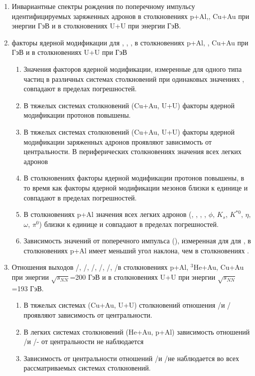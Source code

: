 {}
\begin{enumerate}[beginpenalty=10000] %
	\item 	Инвариантные спектры рождения по поперечному импульсу идентифицируемых заряженных адронов в столкновениях  p+Al,\heau, Cu+Au при энергии  ГэВ и в столкновениях U+U при энергии  ГэВ. \autocite{Gosele1999161,Lermontov}
	\item 	факторы ядерной модификации для \pipm, \Kpm, \prot, \aprot в столкновениях  p+Al, \heau, Cu+Au при  ГэВ и в столкновениях U+U при  ГэВ
		\begin{enumerate} 
			\item 	Значения факторов ядерной модификации, измеренные для одного типа частиц в различных системах столкновений при одинаковых значениях \Npart, совпадают в пределах погрешностей.
			\item В тяжелых системах столкновений  (Cu+Au, U+U) факторы ядерной модификации протонов повышены.
			\item В тяжелых системах столкновений  (Cu+Au, U+U) факторы ядерной модификации заряженных адронов проявляют зависимость от центральности. В периферических столкновениях значения \rab всех легких адронов 
			\item В столкновениях \heau  факторы ядерной модификации протонов повышены, в то время как факторы ядерной модификации мезонов близки к единице и совпадают в пределах погрешностей.
			\item 	В столкновениях p+Al значения \rab всех легких адронов (\pipm, \Kpm, \prot, \aprot, $\phi$, $K_s$, $K^{*0}$, $\eta$, $\omega$, $\pi^0$) близки к единице и совпадают в пределах погрешностей.
			\item 	Зависимость значений \rab от поперечного импульса (\pt), измеренная для для \Kpm, \pipm  в столкновениях p+Al имеет меньший угол наклона, чем в столкновениях \heau.
		\end{enumerate}
	
	\item Отношения выходов \pim/\pip, \Km/\Kp, \prot/\aprot, \prot/\pip, \aprot/\pim, \Kp/\Km в столкновениях  p+Al, $^{3}$He+Au, Cu+Au при энергии $\sqrt{s_{NN}}$=200 ГэВ и в столкновениях U+U при энергии $\sqrt{s_{NN}}$=193 ГэВ.
		\begin{enumerate}
			\item 	В тяжелых системах (Cu+Au, U+U) столкновений отношения \prot/\pip   и \aprot/\pim проявляют зависимость от центральности. 
			\item 	В легких системах столкновений (He+Au, p+Al) зависимость отношений \prot/\pip   и \aprot/\pim - от центральности не наблюдается
			\item 	Зависимость от центральности отношений \Kp/\pip и \Km/\pim не наблюдается во всех рассматриваемых системах столкновений.
		\end{enumerate}

\end{enumerate}


